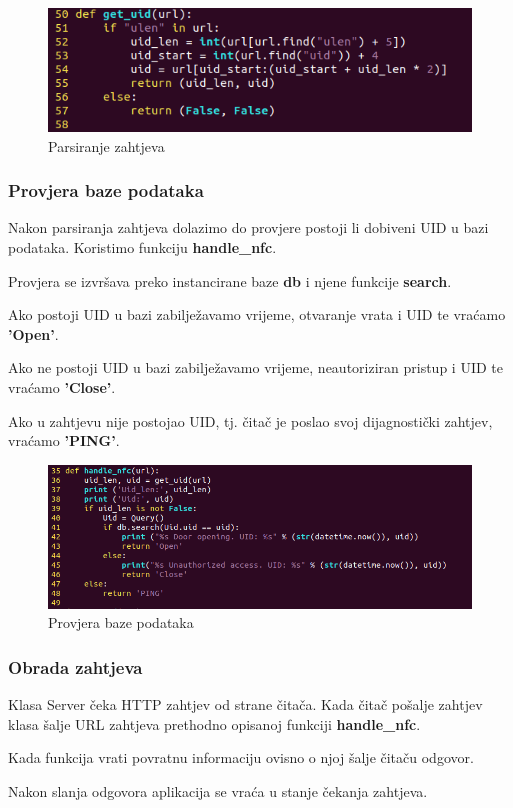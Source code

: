 \documentclass[times, utf8, zavrsni]{fer}
\begin{document}
\begin{figure}[h]
\includegraphics[scale=0.5]{parsiranje.png}
\centering
\caption{Parsiranje zahtjeva}
\centering
\end{figure}

\subsubsection{Provjera baze podataka}
Nakon parsiranja zahtjeva dolazimo do provjere postoji li dobiveni UID u bazi podataka. Koristimo funkciju \textbf{handle\_nfc}.\par 
Provjera se izvršava preko instancirane baze \textbf{db} i njene funkcije \textbf{search}. \par 
Ako postoji UID u bazi zabilježavamo vrijeme, otvaranje vrata i UID te vraćamo \textbf{'Open'}.\par 
Ako ne postoji UID u bazi zabilježavamo vrijeme, neautoriziran pristup i UID te vraćamo \textbf{'Close'}.\par 
Ako u zahtjevu nije postojao UID, tj. čitač je poslao svoj dijagnostički zahtjev, vraćamo \textbf{'PING'}. 
\begin{figure}[h]
\includegraphics[scale=0.5]{baza.png}
\centering
\caption{Provjera baze podataka}
\centering
\end{figure}

\subsubsection{Obrada zahtjeva}
Klasa Server čeka HTTP zahtjev od strane čitača. Kada čitač pošalje zahtjev klasa šalje URL zahtjeva prethodno opisanoj funkciji \textbf{handle\_nfc}. \par
Kada funkcija vrati povratnu informaciju ovisno o njoj šalje čitaču odgovor.\par 
Nakon slanja odgovora aplikacija se vraća u stanje čekanja zahtjeva.
\end{document}
